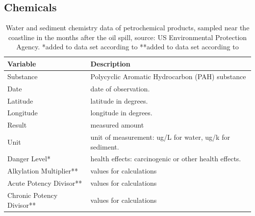 \documentclass[authoryear,12pt]{elsarticle}
\begin{document}
\subsection{Chemicals}

\begin{table}
\begin{tabular}{lp{9.5cm}}
\bf Variable & \bf Description \\\hline
Substance & Polycyclic Aromatic Hydrocarbon (PAH) substance \\
Date & date of observation.\\
Latitude & latitude in degrees. \\
Longitude & longitude in degrees. \\
Result &  measured amount \\
Unit &  unit of measurement: ug/L for water, ug/k for sediment. \\
Danger Level* &  health effects: carcinogenic or other health effects. \\
Alkylation Multiplier** & values for calculations \\
Acute Potency Divisor** & values for calculations\\
Chronic Potency Divisor** & values for calculations 
\end{tabular}
\label{table.animal}
\caption{Water and sediment chemistry data of petrochemical products, sampled near the coastline in the months after the oil spill, source: US Environmental  Protection Agency.\newline
*added to data set according to \citet{pah-danger} \newline
**added to data set according to \citet{pah-benchmark} }
\end{table}
\end{document}
